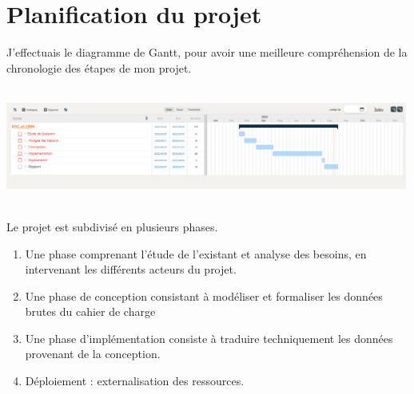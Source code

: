 \section{Planification du projet}
J'effectuais le diagramme de Gantt, pour avoir une meilleure compréhension de la chronologie des étapes de mon projet.
\newline
\newline
\includegraphics[width=500px,height=175px]{./Template LaTeX/Images/gantt.png}
\newline
Le projet est subdivisé en plusieurs phases.
\begin{enumerate}
\item Une phase comprenant l’étude de l’existant et analyse des besoins, en
intervenant les différents acteurs du projet.
\item Une phase de conception consistant à modéliser et formaliser les
données brutes du cahier de charge
\item Une phase d’implémentation consiste à traduire techniquement les
données provenant de la conception.
\item Déploiement : externalisation des ressources.
\end{enumerate}


